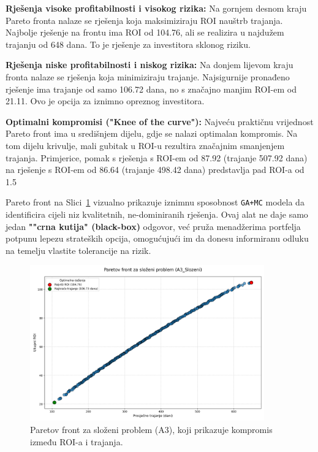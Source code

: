 \textbf{Rješenja visoke profitabilnosti i visokog rizika:} Na gornjem desnom kraju Pareto fronta nalaze se rješenja koja maksimiziraju ROI nauštrb trajanja. Najbolje rješenje na frontu ima ROI od 104.76, ali se realizira u najdužem trajanju od 648 dana. To je rješenje za investitora sklonog riziku.

\textbf{Rješenja niske profitabilnosti i niskog rizika:} Na donjem lijevom kraju fronta nalaze se rješenja koja minimiziraju trajanje. Najsigurnije pronađeno rješenje ima trajanje od samo 106.72 dana, no s značajno manjim ROI-em od 21.11. Ovo je opcija za iznimno opreznog investitora.

\textbf{Optimalni kompromisi ("Knee of the curve"):} Najveću praktičnu vrijednost Pareto front ima u središnjem dijelu, gdje se nalazi optimalan kompromis. Na tom dijelu krivulje, mali gubitak u ROI-u rezultira značajnim smanjenjem trajanja. Primjerice, pomak s rješenja s ROI-em od 87.92 (trajanje 507.92 dana) na rješenje s ROI-em od 86.64 (trajanje 498.42 dana) predstavlja pad ROI-a od 1.5%

Pareto front na Slici~\ref{fig:pareto_front} vizualno prikazuje iznimnu sposobnost \texttt{GA+MC} modela da identificira cijeli niz kvalitetnih, ne-dominiranih rješenja. Ovaj alat ne daje samo jedan \textbf{""crna kutija" (black-box)} odgovor, već pruža menadžerima portfelja potpunu lepezu strateških opcija, omogućujući im da donesu informiranu odluku na temelju vlastite tolerancije na rizik.

\begin{figure}[H]
    \centering
    \includegraphics[width=0.9\textwidth]{slike/grafikoni_final/D_pareto_front_scatter.png}
    \caption{Paretov front za složeni problem (A3), koji prikazuje kompromis između ROI-a i trajanja.}
    \label{fig:pareto_front}
\end{figure}


